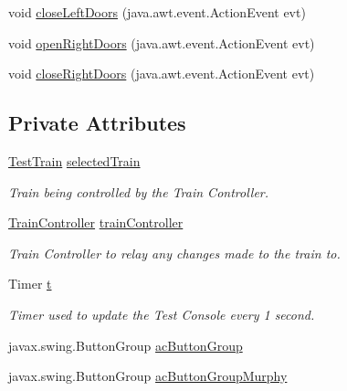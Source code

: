 \begin{DoxyCompactItemize}
\item 
void \hyperlink{classTrainControllerComps_1_1TCTestConsole_a0e23b1193885559198e02aa63c464e36}{close\+Left\+Doors} (java.\+awt.\+event.\+Action\+Event evt)
\item 
void \hyperlink{classTrainControllerComps_1_1TCTestConsole_ab960e72ee109ec472767cfd3dc7ef5fe}{open\+Right\+Doors} (java.\+awt.\+event.\+Action\+Event evt)
\item 
void \hyperlink{classTrainControllerComps_1_1TCTestConsole_af61e73d9719ecd0201ad535893ddca69}{close\+Right\+Doors} (java.\+awt.\+event.\+Action\+Event evt)
\end{DoxyCompactItemize}
\subsection*{Private Attributes}
\begin{DoxyCompactItemize}
\item 
\hyperlink{classTrainControllerComps_1_1TestTrain}{Test\+Train} \hyperlink{classTrainControllerComps_1_1TCTestConsole_a0d334010f5ee13f36d222a1e9c744692}{selected\+Train}
\begin{DoxyCompactList}\small\item\em Train being controlled by the Train Controller. \end{DoxyCompactList}\item 
\hyperlink{classTrainControllerComps_1_1TrainController}{Train\+Controller} \hyperlink{classTrainControllerComps_1_1TCTestConsole_a12271d14ee26a5ac90db1e541954b788}{train\+Controller}
\begin{DoxyCompactList}\small\item\em Train Controller to relay any changes made to the train to. \end{DoxyCompactList}\item 
Timer \hyperlink{classTrainControllerComps_1_1TCTestConsole_a30e4ba9897434ccc699b1d5cb1f80585}{t}
\begin{DoxyCompactList}\small\item\em Timer used to update the Test Console every 1 second. \end{DoxyCompactList}\item 
javax.\+swing.\+Button\+Group \hyperlink{classTrainControllerComps_1_1TCTestConsole_a8f84a548ccc7a10efb6a56bf1d9fb906}{ac\+Button\+Group}
\item 
javax.\+swing.\+Button\+Group \hyperlink{classTrainControllerComps_1_1TCTestConsole_a76ccb33a0cd9dae90633880b28844d19}{ac\+Button\+Group\+Murphy}

\end{DoxyCompactItemize}
